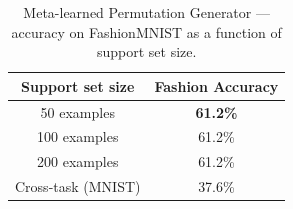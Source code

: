 \begin{table}[h!]
\centering
\caption{Meta-learned Permutation Generator --- accuracy on FashionMNIST as a function of support set size.}
\begin{tabular}{c c}
\hline
\textbf{Support set size} & \textbf{Fashion Accuracy} \\
\hline
50 examples  & \textbf{61.2\%} \\
100 examples & 61.2\% \\
200 examples & 61.2\% \\
Cross-task (MNIST) & 37.6\% \\
\hline
\end{tabular}
\label{tab:meta_perm_gen_results}
\end{table}
